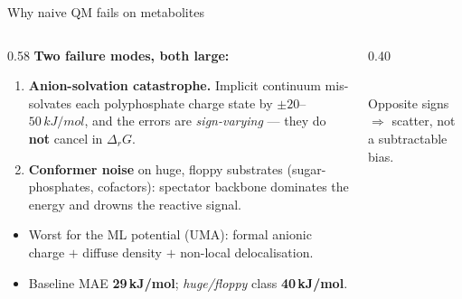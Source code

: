 \documentclass[aspectratio=169,11pt]{beamer}
\newcommand{\kj}{\,kJ/mol}
\begin{document}
\begin{frame}{Why naive QM fails on metabolites}
  \begin{columns}[T]
    \begin{column}{0.58\textwidth}
    \textbf{Two failure modes, both large:}
    \begin{enumerate}
      \item \textbf{Anion-solvation catastrophe.} Implicit continuum mis-solvates each
      polyphosphate charge state by $\pm20$–$50\kj$, and the errors are \emph{sign-varying}
      — they do \textbf{not} cancel in $\Delta_r G$.
      \item \textbf{Conformer noise} on huge, floppy substrates (sugar-phosphates, cofactors):
      spectator backbone dominates the energy and drowns the reactive signal.
    \end{enumerate}
    \vspace{0.4em}
    \begin{itemize}
      \item Worst for the ML potential (UMA): formal anionic charge $+$ diffuse density $+$ non-local delocalisation.
      \item Baseline MAE \textbf{29\kj}; \emph{huge/floppy} class \textbf{40\kj}.
    \end{itemize}
    \end{column}
    \begin{column}{0.40\textwidth}
      \centering
      \\[0.2em]{\scriptsize Opposite signs $\Rightarrow$ scatter, not a subtractable bias.}
    \end{column}
  \end{columns}
\end{frame}
\end{document}
